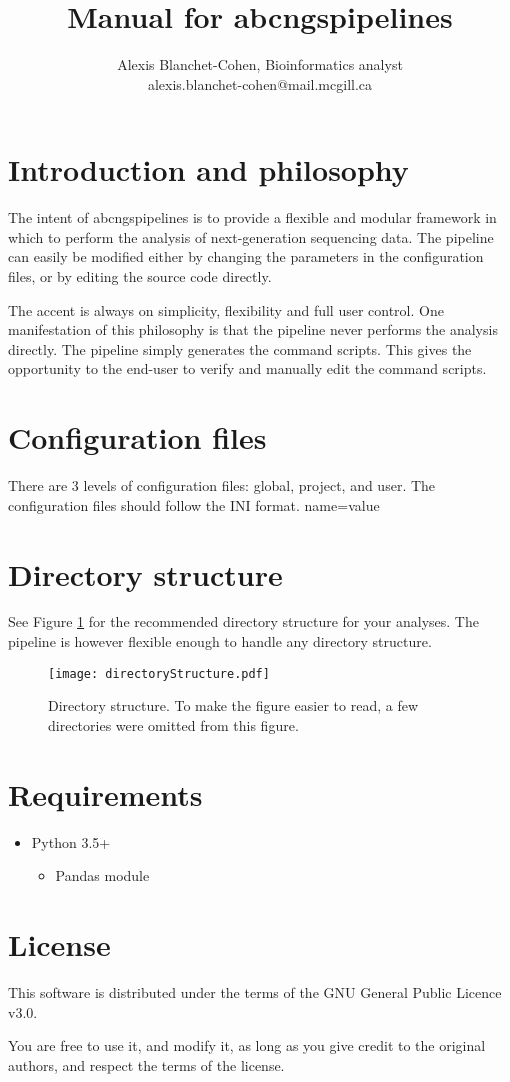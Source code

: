\documentclass[12pt]{article}
\title{ Manual for abcngspipelines }
\author{ Alexis Blanchet-Cohen, Bioinformatics analyst \\ alexis.blanchet-cohen@mail.mcgill.ca}
\begin{document}
\maketitle
\thispagestyle{empty} %

\newpage
\tableofcontents
\newpage

\section{Introduction and philosophy}

The intent of abcngspipelines is to provide a flexible and modular framework in which to perform the analysis of next-generation sequencing data.
The pipeline can easily be modified either by changing the parameters in the configuration files, or by editing the source code directly.

The accent is always on simplicity, flexibility and full user control.
One manifestation of this philosophy is that the pipeline never performs the analysis directly. The pipeline simply generates the command scripts. This gives the opportunity to the end-user to verify and manually edit the command scripts.

\section{Configuration files}
There are 3 levels of configuration files: global, project, and user.
The configuration files should follow the INI format.
\newline
[section]
\newline
name=value

\section{Directory structure}
See Figure \ref{figure:directorystructure} for the recommended directory structure for your analyses.
The pipeline is however flexible enough to handle any directory structure.

\begin{figure}[htb]
\centering
\texttt{[image: directoryStructure.pdf]}
\caption{Directory structure. To make the figure easier to read, a few directories were omitted from this figure.}
\label{figure:directorystructure}
\end{figure}

\section{Requirements}
\begin{itemize}
    \item{Python 3.5+}
    \begin{itemize}
	\item{Pandas module}
    \end{itemize}
\end{itemize}

\section{License}
This software is distributed under the terms of the GNU General Public Licence v3.0.

You are free to use it, and modify it, as long as you give credit to the original authors, and respect the terms of the license.

\clearpage


\end{document}
